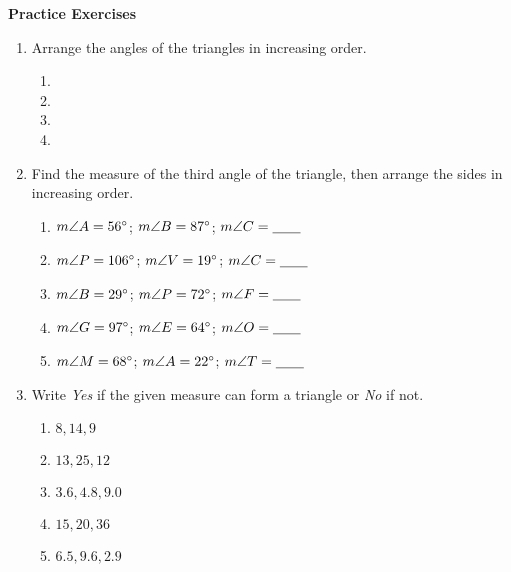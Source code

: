 \def\figdir{/storage/emulated/0/Documents/documents/latex/1920/Grade-8/3rd/inequalities-in-one-triangle/f}

\textbf{Practice Exercises}

\vspce

\begin{enumerate}[label = \Alph*. ]
\item \hspce Arrange the angles of the triangles in increasing order. 

\begin{multicols}{2}

\begin{enumerate}[label = \arabic*. ]
\item 
\item 
\item 
\item 
\end{enumerate} 

\end{multicols} 
\item \hspce Find the measure of the third angle of the triangle, then arrange the sides in increasing order. 

\begin{enumerate}[label = \arabic*. ]
\item $m\angle{A} = 56\degree$; $ m\angle{B} = 87\degree$; $ m\angle{C} = \underline{\hspace{2em}}$
\item $m\angle{P} = 106\degree$; $ m\angle{V} = 19\degree$; $ m\angle{C} = \underline{\hspace{2em}}$
\item $m\angle{B} = 29\degree$; $ m\angle{P} = 72\degree$; $ m\angle{F} = \underline{\hspace{2em}}$
\item $m\angle{G} = 97\degree$; $ m\angle{E} = 64\degree$; $ m\angle{O} = \underline{\hspace{2em}}$
\item $m\angle{M} = 68\degree$; $ m\angle{A} = 22\degree$; $ m\angle{T} = \underline{\hspace{2em}} $
\end{enumerate} 
\item \hspce Write \emph{Yes} if the given measure can form a triangle or \emph{No} if not. 

\vspace*{-0.75ex}

\begin{multicols}{2}

\begin{enumerate}[label = \arabic*. ]
\item \hspce $8, 14, 9$
\item \hspce $13, 25, 12$
\item \hspce $3.6, 4.8, 9.0$
\item \hspce $15, 20, 36$
\item \hspce $6.5, 9.6, 2.9$ 

\end{enumerate}  

\end{multicols}



\end{enumerate} 

